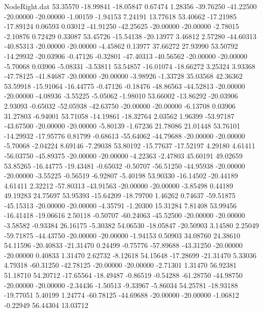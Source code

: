 \begin{filecontents}{NodeRight.dat}
  53.35570  -18.99841  -18.05847     0.67474    1.28356  -39.76250  -41.22500  -20.00000  -20.00000   -1.00159   -1.94153    7.24191   13.77618
  53.40662  -17.21985  -17.89124     0.06593    0.03012  -41.91250  -42.25625  -20.00000  -20.00000   -2.78015   -2.10876    0.72429    0.33087
  53.45726  -15.54138  -20.13977     3.46812    2.57280  -44.60313  -40.85313  -20.00000  -20.00000   -4.45862    0.13977   37.66272   27.93990
  53.50792  -14.29932  -20.03906    -0.47126   -0.32801  -47.40313  -40.56562  -20.00000  -20.00000   -5.70068    0.03906   -5.08331   -3.53811
  53.54857  -16.01074  -18.66272     3.25324    3.93368  -47.78125  -41.84687  -20.00000  -20.00000   -3.98926   -1.33728   35.03568   42.36362
  53.59918  -15.91064  -16.44775    -0.47126   -0.18476  -48.86563  -44.52813  -20.00000  -20.00000   -4.08936   -3.55225   -5.05062   -1.98010
  53.66002  -13.86292  -20.03906     2.93093   -0.65032  -52.05938  -42.63750  -20.00000  -20.00000   -6.13708    0.03906   31.27803   -6.94001
  53.71058  -14.19861  -18.32764     2.03562    1.96399  -53.97187  -43.67500  -20.00000  -20.00000   -5.80139   -1.67236   21.78086   21.01448
  53.76101  -14.29932  -17.95776     0.81799   -0.68613  -55.64062  -44.79688  -20.00000  -20.00000   -5.70068   -2.04224    8.69146   -7.29038
  53.80192  -15.77637  -17.52197     4.29180    4.61411  -56.03750  -45.89375  -20.00000  -20.00000   -4.22363   -2.47803   45.60191   49.02659
  53.85265  -16.44775  -19.43481    -0.65032   -0.50707  -56.51250  -44.95938  -20.00000  -20.00000   -3.55225   -0.56519   -6.92807   -5.40198
  53.90330  -16.14502  -20.44189     4.61411    2.32212  -57.80313  -43.91563  -20.00000  -20.00000   -3.85498    0.44189   49.19283   24.75697
  53.95393  -15.64209  -18.79700     1.46262    0.74637  -59.51875  -45.15313  -20.00000  -20.00000   -4.35791   -1.20300   15.31284    7.81408
  53.99456  -16.41418  -19.06616     2.50118   -0.50707  -60.24063  -45.52500  -20.00000  -20.00000   -3.58582   -0.93384   26.16175   -5.30382
  54.06530  -18.05847  -20.50903     3.14580    2.25049  -59.71875  -44.43750  -20.00000  -20.00000   -1.94153    0.50903   34.08760   24.38610
  54.11596  -20.40833  -21.31470     0.24499   -0.75776  -57.89688  -43.31250  -20.00000  -20.00000    0.40833    1.31470    2.62732   -8.12618
  54.15648  -17.28699  -21.31470     5.33036    4.79318  -60.31250  -42.78125  -20.00000  -20.00000   -2.71301    1.31470   56.92381   51.18710
  54.20712  -17.65564  -18.49487    -0.86519   -0.54288  -61.28750  -44.98750  -20.00000  -20.00000   -2.34436   -1.50513   -9.33967   -5.86034
  54.25781  -18.93188  -19.77051     5.40199    1.24774  -60.78125  -44.69688  -20.00000  -20.00000   -1.06812   -0.22949   56.44304   13.03712

\end{filecontents}
